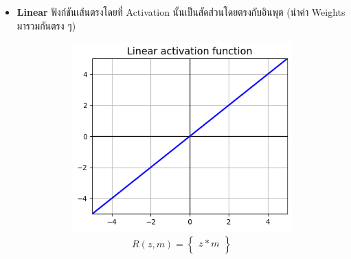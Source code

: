 \begin{itemize}
    \item \textbf{Linear} ฟังก์ชันเส้นตรงโดยที่ Activation นั้นเป็นสัดส่วนโดยตรงกับอินพุต (นำค่า Weights มารวมกันตรง ๆ)
          \begin{figure}[H]
              \centering
              \begin{subfigure}{0.5\textwidth}
                  \centering
                  \includegraphics[width=0.9\linewidth]{fig/actfunc_linear.png}
                  \caption{%
                      \begin{equation}
                          \begin{split}R(z,m) =
                              \begin{Bmatrix}
                                  z*m \\
                              \end{Bmatrix}
                          \end{split}
                      \end{equation}
                  }
                  \label{fig:actfunc_lin}
              \end{subfigure}%
              \begin{subfigure}{0.5\textwidth}
                  \centering

\end{subfigure}
\end{figure}
\end{itemize}

